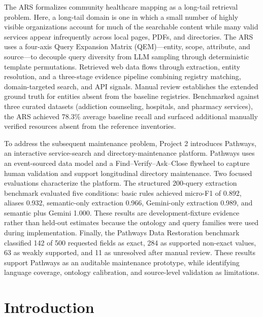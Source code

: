 \documentclass[12pt,oneside]{report}
\begin{document}
The ARS formalizes community healthcare mapping as a long-tail retrieval problem. Here, a long-tail domain is one in which a small number of highly visible organizations account for much of the searchable content while many valid services appear infrequently across local pages, PDFs, and directories. The ARS uses a four-axis Query Expansion Matrix (QEM)—entity, scope, attribute, and source—to decouple query diversity from LLM sampling through deterministic template permutations. Retrieved web data flows through extraction, entity resolution, and a three-stage evidence pipeline combining registry matching, domain-targeted search, and API signals. Manual review establishes the extended ground truth for entities absent from the baseline registries. Benchmarked against three curated datasets (addiction counseling, hospitals, and pharmacy services), the ARS achieved 78.3\% average baseline recall and surfaced additional manually verified resources absent from the reference inventories.

To address the subsequent maintenance problem, Project 2 introduces Pathways, an interactive service-search and directory-maintenance platform. Pathways uses an event-sourced data model and a Find--Verify--Ask--Close flywheel to capture human validation and support longitudinal directory maintenance. Two focused evaluations characterize the platform. The structured 200-query extraction benchmark evaluated five conditions: basic rules achieved micro-F1 of 0.892, aliases 0.932, semantic-only extraction 0.966, Gemini-only extraction 0.989, and semantic plus Gemini 1.000. These results are development-fixture evidence rather than held-out estimates because the ontology and query families were used during implementation. Finally, the Pathways Data Restoration benchmark classified 142 of 500 requested fields as exact, 284 as supported non-exact values, 63 as weakly supported, and 11 as unresolved after manual review. These results support Pathways as an auditable maintenance prototype, while identifying language coverage, ontology calibration, and source-level validation as limitations.
\tableofcontents
\newpage

{} 
\listoffigures
\clearpage

{} 
\listoftables
\clearpage

\chapter{Introduction}
\end{document}
